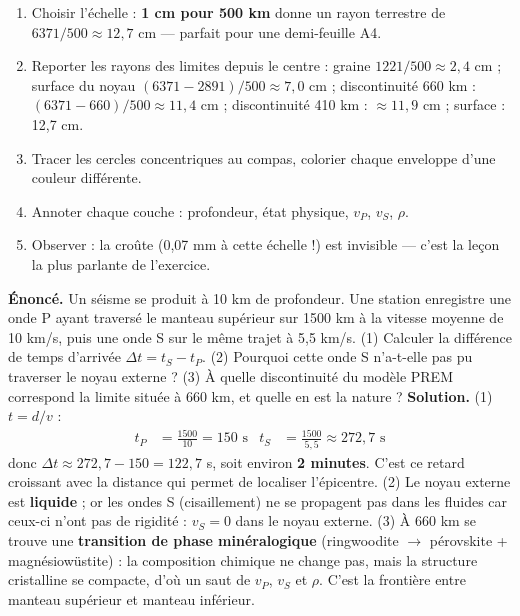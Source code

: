 \documentclass[11pt]{article}
\newcounter{popsec}
\newcounter{popsub}
\newcommand{\courssub}[1]{%
  \stepcounter{popsub}%
  \par\vspace{9pt}\noindent{\popxbold\fontsize{11.5}{13}\selectfont\color{popink}{\color{poporange}\thepopsec.\thepopsub}\hspace{6pt}#1}\par\nopagebreak\vspace{4pt}
}
\begin{document}
\courssub{Construire et exploiter le modèle}

\begin{methode}
\begin{enumerate}
\item Choisir l'échelle : \textbf{1 cm pour 500 km} donne un rayon terrestre de $6371/500 \approx 12,7$ cm — parfait pour une demi-feuille A4.
\item Reporter les rayons des limites depuis le centre : graine $1221/500 \approx 2,4$ cm ; surface du noyau $(6371-2891)/500 \approx 7,0$ cm ; discontinuité 660 km : $(6371-660)/500 \approx 11,4$ cm ; discontinuité 410 km : $\approx 11,9$ cm ; surface : 12,7 cm.
\item Tracer les cercles concentriques au compas, colorier chaque enveloppe d'une couleur différente.
\item Annoter chaque couche : profondeur, état physique, $v_P$, $v_S$, $\rho$.
\item Observer : la croûte (0,07 mm à cette échelle !) est invisible — c'est la leçon la plus parlante de l'exercice.
\end{enumerate}
\end{methode}

\begin{exoresolu}
\textbf{Énoncé.} Un séisme se produit à 10 km de profondeur. Une station enregistre une onde P ayant traversé le manteau supérieur sur 1500 km à la vitesse moyenne de 10 km/s, puis une onde S sur le même trajet à 5,5 km/s. (1) Calculer la différence de temps d'arrivée $\Delta t = t_S - t_P$. (2) Pourquoi cette onde S n'a-t-elle pas pu traverser le noyau externe ? (3) À quelle discontinuité du modèle PREM correspond la limite située à 660 km, et quelle en est la nature ?
\tcblower
\textbf{Solution.} (1) $t = d/v$ :
\begin{align*}
t_P &= \frac{1500}{10} = 150 \text{ s} & t_S &= \frac{1500}{5,5} \approx 272,7 \text{ s}
\end{align*}
donc $\Delta t \approx 272,7 - 150 = 122,7$ s, soit environ \textbf{2 minutes}. C'est ce retard croissant avec la distance qui permet de localiser l'épicentre. (2) Le noyau externe est \textbf{liquide} ; or les ondes S (cisaillement) ne se propagent pas dans les fluides car ceux-ci n'ont pas de rigidité : $v_S = 0$ dans le noyau externe. (3) À 660 km se trouve une \textbf{transition de phase minéralogique} (ringwoodite $\to$ pérovskite + magnésiowüstite) : la composition chimique ne change pas, mais la structure cristalline se compacte, d'où un saut de $v_P$, $v_S$ et $\rho$. C'est la frontière entre manteau supérieur et manteau inférieur.
\end{exoresolu}
\end{document}
